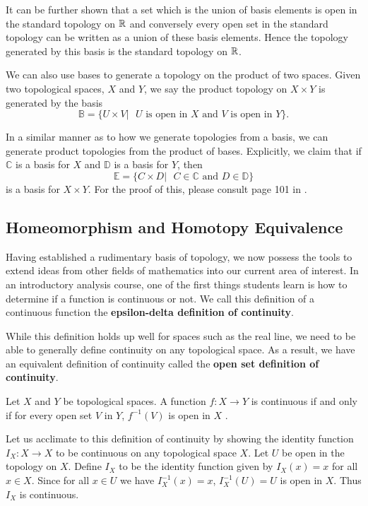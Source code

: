 It can be further shown that a set which is the union of basis elements is open in the standard topology on $\mathbb{R}$ and conversely every open set in the standard topology can be written as a union of these basis elements. Hence the topology generated by this basis is the standard topology on $\mathbb{R}$.

We can also use bases to generate a topology on the product of two spaces. Given two  topological spaces, $X$ and $Y$, we say the product topology on $X\times Y$ is generated by the basis
$$\mathbb{B}=\{U\times V|\text{ } U \text{ is open in } X \text{ and } V \text{ is open in }Y\}.$$

In a similar manner as to how we generate topologies from a basis, we can generate product topologies from the product of bases. Explicitly, we claim that if $\mathbb{C}$ is a basis for $X$ and $\mathbb{D}$ is a basis for $Y$, then $$\mathbb{E}=\{ C\times D |\text{ }C\in \mathbb{C} \text{ and } D\in \mathbb{D}\}$$ is a basis for $X\times Y$. For the proof of this, please consult page 101 in \cite{top}.

\subsection{Homeomorphism and Homotopy Equivalence }
Having established a rudimentary basis of topology, we now possess the tools to extend ideas from other fields of mathematics into our current area of interest. In an introductory analysis course, one of the first things students learn is how to determine if a function is continuous or not. We call this definition of a continuous function the \textbf{epsilon-delta definition of continuity}. 

While this definition holds up well for spaces such as the real line, we need to be able to generally define continuity on any topological space. As a result, we have an equivalent definition of continuity called the \textbf{open set definition of continuity}\cite{top}.

\begin{defn}
Let $X$ and $Y$ be topological spaces. A function $f\colon X \rightarrow Y$ is continuous if and only if for every open set $V$ in $Y$, $f^{-1}(V)$ is open in $X$ . 
\end{defn}

Let us acclimate to this definition of continuity by showing the identity function $I_X\colon X\rightarrow X$ to be continuous on any topological space $X$. Let $U$ be open in the topology on $X$. Define $I_X$ to be the identity function given by $I_X(x)=x$ for all $x\in X$. Since for all $x\in U$ we have $I^{-1}_X(x)=x$, $I^{-1}_X(U)=U$ is open in $X$. Thus $I_X$ is continuous. 


